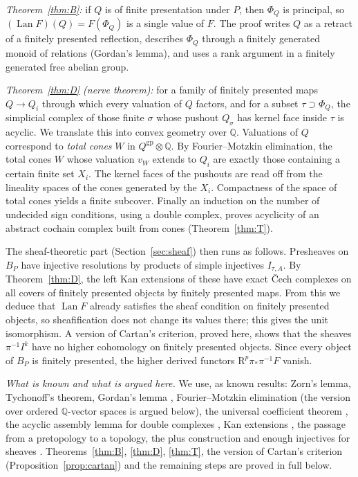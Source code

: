 \documentclass[11pt]{article}
\theoremstyle{definition}
\theoremstyle{remark}
\newcommand{\QQ}{\mathbb{Q}}
\newcommand{\gp}{\mathrm{gp}}
\newcommand{\Lan}{\operatorname{Lan}}
\begin{document}
\emph{Theorem~\ref{thm:B}:} if $Q$ is of finite presentation under $P$, then $\Phi_Q$ is principal, so $(\Lan F)(Q)=F(\Phi_Q)$ is a single value of $F$. The proof writes $Q$ as a retract of a finitely presented reflection, describes $\Phi_Q$ through a finitely generated monoid of relations (Gordan's lemma), and uses a rank argument in a finitely generated free abelian group.

\emph{Theorem~\ref{thm:D} (nerve theorem):} for a family of finitely presented maps $Q\to Q_i$ through which every valuation of $Q$ factors, and for a subset $\tau\supset\Phi_Q$, the simplicial complex of those finite $\sigma$ whose pushout $Q_\sigma$ has kernel face inside $\tau$ is acyclic. We translate this into convex geometry over $\QQ$. Valuations of $Q$ correspond to \emph{total cones} $W$ in $Q^{\gp}\otimes\QQ$. By Fourier--Motzkin elimination, the total cones $W$ whose valuation $v_W$ extends to $Q_i$ are exactly those containing a certain finite set $X_i$. The kernel faces of the pushouts are read off from the lineality spaces of the cones generated by the $X_i$. Compactness of the space of total cones yields a finite subcover. Finally an induction on the number of undecided sign conditions, using a double complex, proves acyclicity of an abstract cochain complex built from cones (Theorem~\ref{thm:T}).

The sheaf-theoretic part (Section~\ref{sec:sheaf}) then runs as follows. Presheaves on $B_P$ have injective resolutions by products of simple injectives $I_{\tau,A}$. By Theorem~\ref{thm:D}, the left Kan extensions of these have exact Čech complexes on all covers of finitely presented objects by finitely presented maps. From this we deduce that $\Lan F$ already satisfies the sheaf condition on finitely presented objects, so sheafification does not change its values there; this gives the unit isomorphism. A version of Cartan's criterion, proved here, shows that the sheaves $\pi^{-1}I^k$ have no higher cohomology on finitely presented objects. Since every object of $B_P$ is finitely presented, the higher derived functors $\mathrm R^p\pi_*\pi^{-1}F$ vanish.

\emph{What is known and what is argued here.} We use, as known results: Zorn's lemma, Tychonoff's theorem, Gordan's lemma \cite{Gordan,Fulton}, Fourier--Motzkin elimination \cite{Schrijver} (the version over ordered $\QQ$-vector spaces is argued below), the universal coefficient theorem \cite{Hatcher}, the acyclic assembly lemma for double complexes \cite{Weibel}, Kan extensions \cite{MacLane}, the passage from a pretopology to a topology, the plus construction and enough injectives for sheaves \cite{SGA4,Tohoku}. Theorems~\ref{thm:B}, \ref{thm:D}, \ref{thm:T}, the version of Cartan's criterion (Proposition~\ref{prop:cartan}) and the remaining steps are proved in full below.
\end{document}
